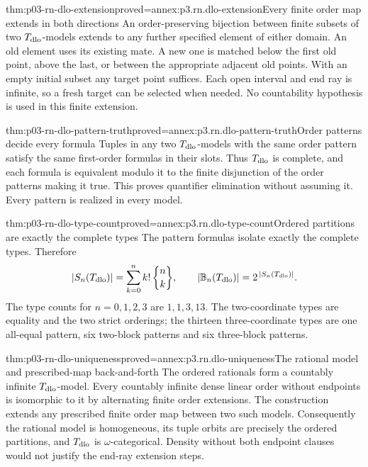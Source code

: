 \begin{hblemma}{thm:p03-rn-dlo-extension}{proved=annex:p3.rn.dlo-extension}{Every finite order map extends in both directions}
An order-preserving bijection between finite subsets of two
\(T_{\rm dlo}\)-models extends to any further specified
element of either domain.
An old element uses its existing mate.
A new one is matched below the first old point, above the last,
or between the appropriate adjacent old points.
With an empty initial subset any target point suffices.
Each open interval and end ray is infinite, so a fresh target
can be selected when needed.
No countability hypothesis is used in this finite extension.
\end{hblemma}

\begin{hbtheorem}{thm:p03-rn-dlo-pattern-truth}{proved=annex:p3.rn.dlo-pattern-truth}{Order patterns decide every formula}
Tuples in any two \(T_{\rm dlo}\)-models with the same order
pattern satisfy the same first-order formulas in their slots.
Thus \(T_{\rm dlo}\) is complete, and each formula is
equivalent modulo it to the finite disjunction of the order
patterns making it true.
This proves quantifier elimination without assuming it.
Every pattern is realized in every model.
\end{hbtheorem}

\begin{hbcorollary}{thm:p03-rn-dlo-type-count}{proved=annex:p3.rn.dlo-type-count}{Ordered partitions are exactly the complete types}
The pattern formulas isolate exactly the complete types.
Therefore
\[
 |S_n(T_{\rm dlo})|=\sum_{k=0}^n k!\,{n\brace k},
 \qquad
 |\mathbb B_n(T_{\rm dlo})|=2^{\,|S_n(T_{\rm dlo})|}.
\]
The type counts for \(n=0,1,2,3\) are \(1,1,3,13\).
The two-coordinate types are equality and the two strict
orderings; the thirteen three-coordinate types are one
all-equal pattern, six two-block patterns and six three-block
patterns.
\end{hbcorollary}

\begin{hbtheorem}{thm:p03-rn-dlo-uniqueness}{proved=annex:p3.rn.dlo-uniqueness}{The rational model and prescribed-map back-and-forth}
The ordered rationals form a countably infinite
\(T_{\rm dlo}\)-model. Every countably infinite dense linear
order without endpoints is isomorphic to it by alternating
finite order extensions.
The construction extends any prescribed finite order map
between two such models.
Consequently the rational model is homogeneous, its tuple
orbits are precisely the ordered partitions, and
\(T_{\rm dlo}\) is \(\omega\)-categorical.
Density without both endpoint clauses would not justify
the end-ray extension steps.
\end{hbtheorem}

